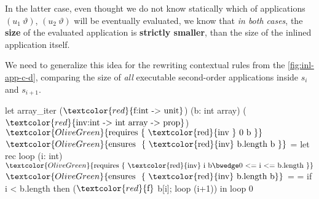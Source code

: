 In the latter case, even thought we do not know statically which of applications $(u_1~\vartheta)$, $(u_2~\vartheta)$  will be eventually evaluated, we  know that  \textit{in both cases},  the \textbf{size} of the evaluated application is \textbf{strictly smaller}, than the size of the inlined application itself.
	
	We need to generalize this idea for the rewriting contextual rules from the \cref{fig:inl-app-c-d}, comparing the size of \textit{all} executable second-order applications inside $s_{i}$ and $s_{i+1}$. 
	
	
		\begin{adjustwidth}{-4em}{-2em}
\begin{footnotesize}
\begin{minipage}[t]{0.3\linewidth}
\begin{whycode}  
   let array_iter ($\textcolor{red}{\text{f:int -> unit}}$) (b: int array) 
                  ($\textcolor{red}{\text{inv:int -> int array -> prop}}$)    
     $\textcolor{OliveGreen}{\text{requires \{ \textcolor{red}{\text{inv }} 0~b \}}}$
     $\textcolor{OliveGreen}{\text{ensures~~}\{ \text{ \textcolor{red}{inv} b.length~b }\}}$  
   = let rec loop (i: int)
       $\textcolor{OliveGreen}{ \text{requires \{~\textcolor{red}{inv} i b} \bwedge \text{0 <= i <= b.length}~\}}$
       $\textcolor{OliveGreen}{\text{ensures~~}\{ \text{ \textcolor{red}{inv} b.length~b}\}}$ =    
       = if i < b.length then ($\textcolor{red}{\text{f}}$ b[i]; loop (i+1)) 
     in loop 0
   

\end{whycode}
\end{minipage}
\end{footnotesize}
\end{adjustwidth}
